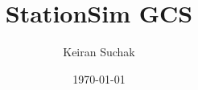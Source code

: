 \documentclass[11pt, a4paper]{article}
\begin{document}
\title{StationSim GCS}
\author{Keiran Suchak}
\date{\today}
\maketitle







\end{document}
